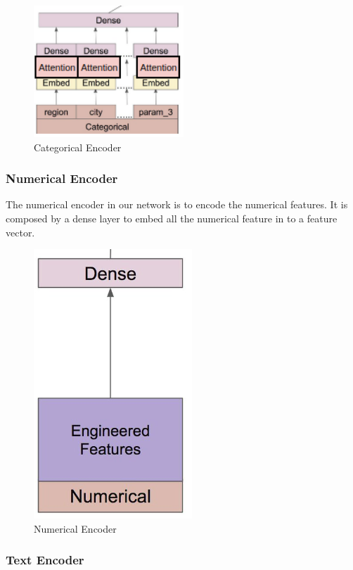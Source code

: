 \documentclass{article}
\begin{document}
\pagebreak

\begin{figure}[h]
  \centering
  \includegraphics[scale=1]{cat.png}
  \caption{Categorical Encoder}
\end{figure}


\subsubsection{Numerical Encoder}

The numerical encoder in our network is to encode the numerical features. It is composed by a dense layer to embed all the numerical feature in to a feature vector.

\begin{figure}[h]
  \centering
  \includegraphics[scale=0.5]{numerical.png}
  \caption{Numerical Encoder}
\end{figure}

\subsubsection{Text Encoder}
\end{document}
